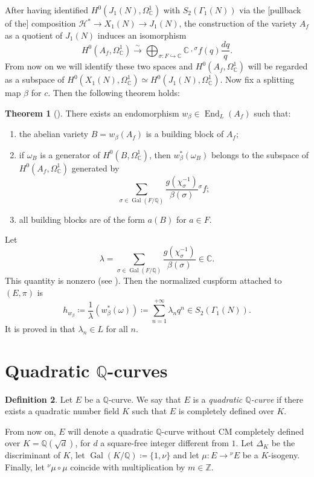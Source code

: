 \documentclass[11pt]{amsart}
\theoremstyle{definition}
\newtheorem{definizione}{Definition}[section]
\newtheorem{thm}[definizione]{Theorem}
\begin{document}
 		After having identified $H^0(J_1(N),\Omega^1_{\mathbb{C}})$ with $S_2(\Gamma_1(N))$ via the [pullback of the] composition ${\mathcal{H}}^* \to X_1(N)\to J_1(N)$, the construction of the variety $A_f$ as a quotient of $J_1(N)$ induces an isomorphism
  		$$H^0(A_f,\Omega^1_{\mathbb{C}})\stackrel{\sim}{\to} \bigoplus_{\sigma\colon F {\hookrightarrow} {\mathbb{C}}}{\mathbb{C}}\cdot  {{}^\sigma\!} f(q)\frac{dq}{q}.$$
  		From now on we will identify these two spaces and $H^0(A_f,\Omega^1_{\mathbb{C}})$ will be regarded as a subspace of $H^0(X_1(N),\Omega^1_{\mathbb{C}})\simeq H^0(J_1(N),\Omega^1_{\mathbb{C}})$.
		Now fix a splitting map $\beta$ for $c$. Then the following theorem holds:
  			\begin{thm}[\cite{gola}]\label{betaend}
    				There exists an endomorphism $w_{\beta}\in \operatorname{End}_L(A_f)$ such that:
    					\begin{enumerate}
      					\item the abelian variety $B=w_{\beta}(A_f)$ is a building block of $A_f$;
      					\item if $\omega_B$ is a generator of $H^0(B,\Omega^1_{\mathbb{C}})$, then $w_{\beta}^*(\omega_B)$ belongs to the subspace of $H^0(A_f,\Omega^1_{\mathbb{C}})$ generated by 
							$$\sum_{\sigma\in \operatorname{Gal}(F/{\mathbb{Q}})}\frac{g(\chi_{\sigma}^{-1})}{\beta(\sigma)}{{}^\sigma\!} f;$$
      					\item all building blocks are of the form $a(B)$ for $a\in F$.
  				\end{enumerate}
		\end{thm}
  		Let 
  		$$\lambda=\sum_{\sigma \in\operatorname{Gal}(F/{\mathbb{Q}})}\frac{g(\chi_{\sigma}^{-1})}{\beta(\sigma)}\in {\mathbb{C}}.$$
  		This quantity is nonzero (see \cite[Lemma 3.1]{gola}). Then the normalized cuspform attached to $(E,\pi)$ is 
  		$$h_{w_{\beta}}\coloneqq \frac{1}{\lambda}(w_{\beta}^*(\omega))\coloneqq \sum_{n=1}^{+\infty}\lambda_nq^n\in S_2(\Gamma_1(N)).$$
  		It is proved in \cite{gola} that $\lambda_n\in L$ for all $n$.

	\section{Quadratic
\texorpdfstring{${\mathbb{Q}}$}{}-curves}\label{quacur}
			\begin{definizione}
				Let $E$ be a ${\mathbb{Q}}$-curve. We say that $E$ is a \emph{quadratic ${\mathbb{Q}}$-curve} if there exists a quadratic number field $K$ such that $E$ is completely defined over $K$.
		\end{definizione}
  		From now on, $E$ will denote a quadratic ${\mathbb{Q}}$-curve without CM completely defined over $K={\mathbb{Q}}(\sqrt{d})$, for $d$ a square-free integer different from $1$. Let $\Delta_K$ be the discriminant of $K$, let $\operatorname{Gal}(K/{\mathbb{Q}})\coloneqq \{1,\nu\}$ and let $\mu\colon E\to {}^{\nu}E$ be a $K$-isogeny. Finally, let ${{}^\nu\!}\mu\circ\mu$ coincide with multiplication by $m\in {\mathbb{Z}}$.
\end{document}
